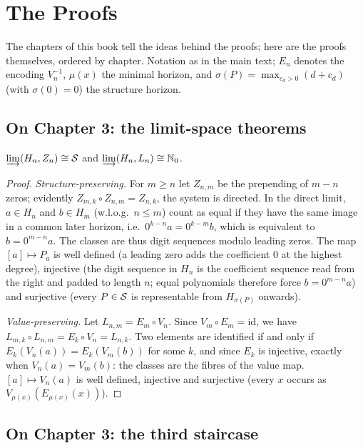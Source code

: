 \chapter{The Proofs}
\label{ch:anhang-beweise}

The chapters of this book tell the ideas behind the proofs; here are
the proofs themselves, ordered by chapter. Notation as in the main
text; $E_n$ denotes the encoding $V_n^{-1}$, $\mu(x)$ the minimal
horizon, and $\sigma(P)=\max_{c_d>0}(d+c_d)$ (with $\sigma(0)=0$)
the structure horizon.

\section*{On Chapter 3: the limit-space theorems}

\begin{satz}
$\varinjlim(H_n,Z_n)\cong\mathcal S$ and
$\varinjlim(H_n,L_n)\cong\mathbb N_0$.
\end{satz}

\begin{proof}
\emph{Structure-preserving.} For $m\ge n$ let $Z_{n,m}$ be the
prepending of $m-n$ zeros; evidently
$Z_{m,k}\circ Z_{n,m}=Z_{n,k}$, the system is directed. In the
direct limit, $a\in H_n$ and $b\in H_m$ (w.l.o.g.\ $n\le m$) count
as equal if they have the same image in a common later horizon,
i.e.\ $0^{k-n}a=0^{k-m}b$, which is equivalent to $b=0^{m-n}a$. The
classes are thus digit sequences modulo leading zeros. The map
$[a]\mapsto P_a$ is well defined (a leading zero adds the
coefficient $0$ at the highest degree), injective (the digit
sequence in $H_n$ is the coefficient sequence read from the right
and padded to length $n$; equal polynomials therefore force
$b=0^{m-n}a$) and surjective (every $P\in\mathcal S$ is representable
from $H_{\sigma(P)}$ onwards).

\emph{Value-preserving.} Let $L_{n,m}=E_m\circ V_n$. Since
$V_m\circ E_m=\mathrm{id}$, we have
$L_{m,k}\circ L_{n,m}=E_k\circ V_n=L_{n,k}$. Two elements are
identified if and only if $E_k(V_n(a))=E_k(V_m(b))$ for some $k$,
and since $E_k$ is injective, exactly when $V_n(a)=V_m(b)$: the
classes are the fibres of the value map. $[a]\mapsto V_n(a)$ is
well defined, injective and surjective (every $x$ occurs as
$V_{\mu(x)}(E_{\mu(x)}(x))$).
\end{proof}

\section*{On Chapter 3: the third staircase}

